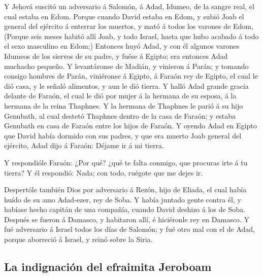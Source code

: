  Y Jehová suscitó un adversario á Salomón, á Adad,
Idumeo, de la sangre real, el cual estaba en Edom. 
Porque cuando David estaba en Edom, y subió Joab el general del ejército
á enterrar los muertos, y mató á todos los varones de Edom,
 (Porque seis meses habitó allí Joab, y todo Israel,
hasta que hubo acabado á todo el sexo masculino en Edom;)
 Entonces huyó Adad, y con él algunos varones Idumeos de
los siervos de su padre, y fuése á Egipto; era entonces Adad muchacho
pequeño.  Y levantáronse de Madián, y vinieron á Parán; y
tomando consigo hombres de Parán, viniéronse á Egipto, á Faraón rey de
Egipto, el cual le dió casa, y le señaló alimentos, y aun le dió tierra.
 Y halló Adad grande gracia delante de Faraón, el cual le
dió por mujer á la hermana de su esposa, á la hermana de la reina
Thaphnes.  Y la hermana de Thaphnes le parió á su hijo
Genubath, al cual destetó Thaphnes dentro de la casa de Faraón; y estaba
Genubath en casa de Faraón entre los hijos de Faraón.  Y
oyendo Adad en Egipto que David había dormido con sus padres, y que era
muerto Joab general del ejército, Adad dijo á Faraón: Déjame ir á mi
tierra.

 Y respondióle Faraón: ¿Por qué? ¿qué te falta conmigo,
que procuras irte á tu tierra? Y él respondió: Nada; con todo, ruégote
que me dejes ir.

 Despertóle también Dios por adversario á Rezón, hijo de
Eliada, el cual había huído de su amo Adad-ezer, rey de Soba.
 Y había juntado gente contra él, y habíase hecho capitán
de una compañía, cuando David deshizo á los de Soba. Después se fueron á
Damasco, y habitaron allí, é hiciéronle rey en Damasco. 
Y fué adversario á Israel todos los días de Salomón; y fué otro mal con
el de Adad, porque aborreció á Israel, y reinó sobre la Siria.

\hypertarget{la-indignaciuxf3n-del-efraimita-jeroboam}{%
\subsection{La indignación del efraimita
Jeroboam}\label{la-indignaciuxf3n-del-efraimita-jeroboam}}

